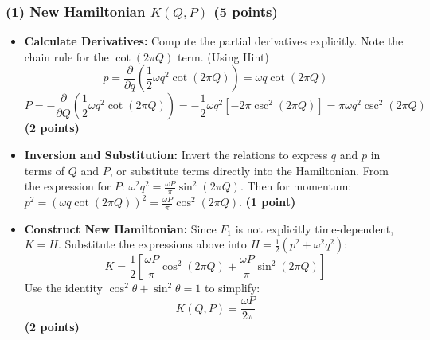 \documentclass[11pt, a4paper]{article} %
\begin{document}
\subsubsection*{(1) New Hamiltonian $K(Q, P)$ (5 points)}
\begin{itemize}
    
    \item \textbf{Calculate Derivatives:}
    Compute the partial derivatives explicitly. Note the chain rule for the $\cot(2\pi Q)$ term. (Using Hint)
    \[ p = \frac{\partial}{\partial q}\left(\frac{1}{2} \omega q^2 \cot(2\pi Q)\right) = \omega q \cot(2\pi Q) \]
    \[ P = -\frac{\partial}{\partial Q}\left(\frac{1}{2} \omega q^2 \cot(2\pi Q)\right) = -\frac{1}{2}\omega q^2 \left[ -2\pi \csc^2(2\pi Q) \right] = \pi \omega q^2 \csc^2(2\pi Q) \]
    \hfill \textbf{(2 points)} \\

    \item \textbf{Inversion and Substitution:}
    Invert the relations to express $q$ and $p$ in terms of $Q$ and $P$, or substitute terms directly into the Hamiltonian.
    From the expression for $P$: $\omega^2 q^2 = \frac{\omega P}{\pi} \sin^2(2\pi Q)$.
    Then for momentum: $p^2 = (\omega q \cot(2\pi Q))^2 = \frac{\omega P}{\pi} \cos^2(2\pi Q)$.
    \hfill \textbf{(1 point)}

    \item \textbf{Construct New Hamiltonian:}
    Since $F_1$ is not explicitly time-dependent, $K = H$. Substitute the expressions above into $H = \frac{1}{2}(p^2 + \omega^2 q^2)$:
    \[ K = \frac{1}{2} \left[ \frac{\omega P}{\pi} \cos^2(2\pi Q) + \frac{\omega P}{\pi} \sin^2(2\pi Q) \right] \]
    Use the identity $\cos^2 \theta + \sin^2 \theta = 1$ to simplify:
    \[ K(Q, P) = \frac{\omega P}{2\pi} \]
    \hfill \textbf{(2 points)} \\
\end{itemize}
\end{document}
